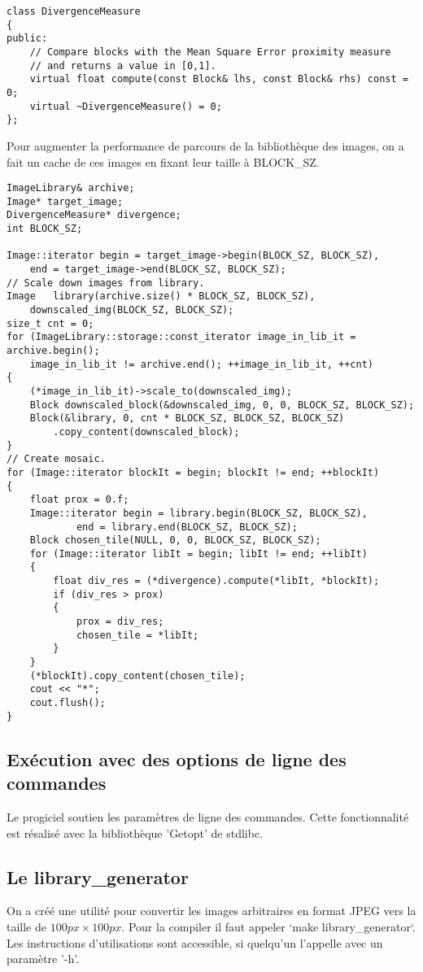 \documentclass[a4paper]{article}
\begin{document}
\begin{lstlisting}
class DivergenceMeasure
{
public:
	// Compare blocks with the Mean Square Error proximity measure
	// and returns a value in [0,1].
	virtual float compute(const Block& lhs, const Block& rhs) const = 0;
	virtual ~DivergenceMeasure() = 0;
};
\end{lstlisting}

Pour augmenter la performance de parcours de la biblioth\`eque des images, on a fait un cache de ces images en fixant leur taille \`a BLOCK\_SZ.

\begin{lstlisting}
ImageLibrary& archive;
Image* target_image;
DivergenceMeasure* divergence;
int BLOCK_SZ;

Image::iterator begin = target_image->begin(BLOCK_SZ, BLOCK_SZ),
	end = target_image->end(BLOCK_SZ, BLOCK_SZ);
// Scale down images from library.
Image	library(archive.size() * BLOCK_SZ, BLOCK_SZ),
	downscaled_img(BLOCK_SZ, BLOCK_SZ);
size_t cnt = 0;
for (ImageLibrary::storage::const_iterator image_in_lib_it = archive.begin();
	image_in_lib_it != archive.end(); ++image_in_lib_it, ++cnt)
{
	(*image_in_lib_it)->scale_to(downscaled_img);
	Block downscaled_block(&downscaled_img, 0, 0, BLOCK_SZ, BLOCK_SZ);
	Block(&library, 0, cnt * BLOCK_SZ, BLOCK_SZ, BLOCK_SZ)
		.copy_content(downscaled_block);
}
// Create mosaic.
for (Image::iterator blockIt = begin; blockIt != end; ++blockIt)
{
	float prox = 0.f;
	Image::iterator	begin = library.begin(BLOCK_SZ, BLOCK_SZ),
			end = library.end(BLOCK_SZ, BLOCK_SZ);
	Block chosen_tile(NULL, 0, 0, BLOCK_SZ, BLOCK_SZ);
	for (Image::iterator libIt = begin; libIt != end; ++libIt)
	{
		float div_res = (*divergence).compute(*libIt, *blockIt);
		if (div_res > prox)
		{
			prox = div_res;
			chosen_tile = *libIt;
		}
	}
	(*blockIt).copy_content(chosen_tile);
	cout << "*";
	cout.flush();
}
\end{lstlisting}

\subsection{Ex\'ecution avec des options de ligne des commandes}
Le progiciel soutien les param\`etres de ligne des commandes.
Cette fonctionnalit\'e est r\'esalis\'e avec la biblioth\`eque 'Getopt' de stdlibc.

\subsection{Le library\_generator}
On a cr\'e\'e une utilit\'e pour convertir les images arbitraires en format JPEG vers la taille de $ 100px \times 100px $.
Pour la compiler il faut appeler `make library\_generator`.
Les instructions d'utilisations sont accessible, si quelqu'un l'appelle avec un param\`etre '-h'.
\end{document}
